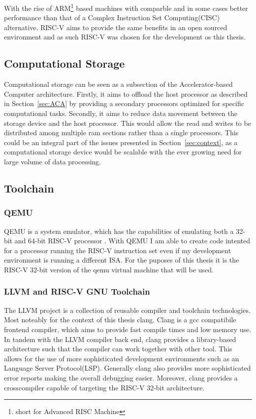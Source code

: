 With the rise of ARM\footnote{short for Advanced RISC Machine} based machines
with comparble and in some cases better performance than that of a Complex
Instruction Set Computing(CISC) alternative.\cite{Power_Struggle} RISC-V aims to
provide the same benefits in an open sourced environment and as such RISC-V was
chosen for the development os this thesis.

\subsection{Computational Storage}
Computational storage can be seen as a subsection of the Accelerator-based
Computer architecture. Firstly, it aims to offload the host processor as
described in Section~\ref{sec:ACA} by providing a secondary processors optimized
for specific computational tasks. Secondly, it aims to reduce data movement
between the storage device and the host processor. This would allow the read and
writes to be distributed among multiple ram sections rather than a single
processors. This could be an integral part of the issues presented in
Section~\ref{sec:context}, as a computational storage device would be scalable
with the ever growing need for large volume of data processing.


\subsection{Toolchain}
\subsubsection{QEMU}
QEMU is a system emulator, which has the capabilities of emulating both a 32-bit
and 64-bit RISC-V processor \cite{QEMU}. With QEMU I am able to create code intented
for a processor running the RISC-V instruction set even if my development
environment is running a different ISA. For the puposes of this thesis it is the
RISC-V 32-bit version of the qemu virtual machine that will be used.

\subsubsection{LLVM and RISC-V GNU Toolchain}
The LLVM project is a collection of reusable compiler and toolchain
technologies. Most noteably for the context of this thesis clang. Clang is a gcc
compatibile frontend compiler, which aims to provide fast compile times and low
memory use. In tandem with the LLVM compiler back end, clang provides a
library-based architecture such that the compiler can work together with other
tool. This allows for the use of more sophisticated development environments
such as an Language Server Protocol(LSP). Generally clang also provides more
sophisticated error reports making the overall debugging easier. Moreover, clang
provides a crosscompiler capable of targeting the RISC-V 32-bit architecture.


